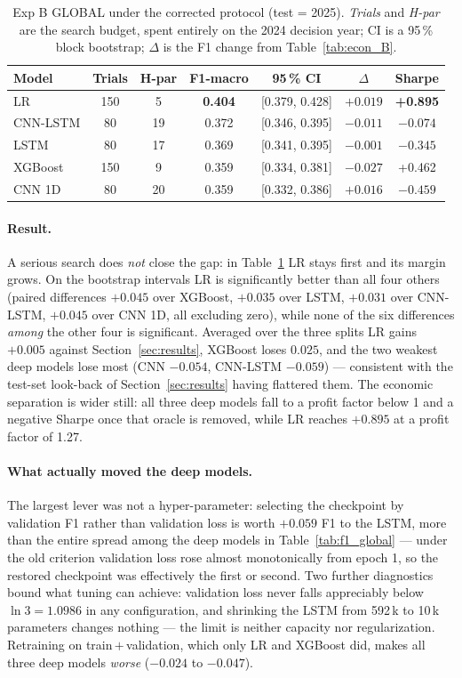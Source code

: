 \documentclass[runningheads]{llncs}
\begin{document}
\begin{table}[htbp]
\centering
\small
\caption{Exp B GLOBAL under the corrected protocol (test = 2025). \emph{Trials} and
\emph{H-par} are the search budget, spent entirely on the 2024 decision year; CI is
a 95\,\% block bootstrap; $\Delta$ is the F1 change from Table~\ref{tab:econ_B}.}
\label{tab:robust}
\begin{tabular}{lcccccc}
\toprule
Model & Trials & H-par & F1-macro & 95\,\% CI & $\Delta$ & Sharpe \\
\midrule
LR & 150 & 5 & \textbf{0.404} & [0.379, 0.428] & $+0.019$ & \textbf{+0.895} \\
CNN-LSTM & 80 & 19 & 0.372 & [0.346, 0.395] & $-0.011$ & $-0.074$ \\
LSTM & 80 & 17 & 0.369 & [0.341, 0.395] & $-0.001$ & $-0.345$ \\
XGBoost & 150 & 9 & 0.359 & [0.334, 0.381] & $-0.027$ & +0.462 \\
CNN 1D & 80 & 20 & 0.359 & [0.332, 0.386] & $+0.016$ & $-0.459$ \\
\bottomrule
\end{tabular}
\end{table}

\paragraph{Result.}
A serious search does \emph{not} close the gap: in Table~\ref{tab:robust} LR stays
first and its margin grows. On the bootstrap intervals LR is significantly better
than all four others (paired differences $+0.045$ over XGBoost, $+0.035$ over LSTM,
$+0.031$ over CNN-LSTM, $+0.045$ over CNN 1D, all excluding zero), while none of the
six differences \emph{among} the other four is significant. Averaged over the three
splits LR gains $+0.005$ against Section~\ref{sec:results}, XGBoost loses $0.025$,
and the two weakest deep models lose most (CNN $-0.054$, CNN-LSTM $-0.059$) ---
consistent with the test-set look-back of Section~\ref{sec:results} having
flattered them. The economic separation is wider still: all three deep models fall
to a profit factor below 1 and a negative Sharpe once that oracle is removed, while
LR reaches $+0.895$ at a profit factor of 1.27.

\paragraph{What actually moved the deep models.}
The largest lever was not a hyper-parameter: selecting the checkpoint by validation
F1 rather than validation loss is worth $+0.059$ F1 to the LSTM, more than the
entire spread among the deep models in Table~\ref{tab:f1_global} --- under the old
criterion validation loss rose almost monotonically from epoch 1, so the restored
checkpoint was effectively the first or second. Two further diagnostics bound what
tuning can achieve: validation loss never falls appreciably below $\ln 3 = 1.0986$
in any configuration, and shrinking the LSTM from 592\,k to 10\,k parameters
changes nothing --- the limit is neither capacity nor regularization. Retraining on
train\,$+$\,validation, which only LR and XGBoost did, makes all three deep models
\emph{worse} ($-0.024$ to $-0.047$).
\end{document}
